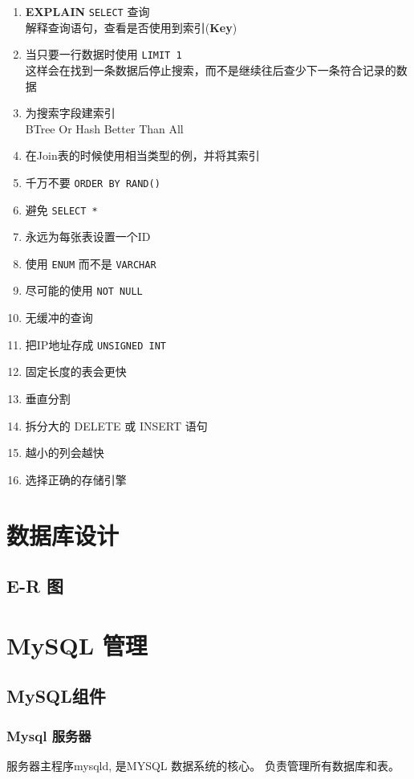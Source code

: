 \documentclass[UTF8,a4paper,12pt]{ctexbook}
\begin{document}
		\begin{enumerate}
			\item \textbf{EXPLAIN} \verb|SELECT| 查询 \\ 解释查询语句，查看是否使用到索引(\textbf{Key})
			\item 当只要一行数据时使用 \verb|LIMIT 1|  \\ 这样会在找到一条数据后停止搜索，而不是继续往后查少下一条符合记录的数据
			\item 为搜索字段建索引 \\ BTree Or Hash Better Than All
			\item 在Join表的时候使用相当类型的例，并将其索引
			\item 千万不要 \verb|ORDER BY RAND()|
			\item 避免 \verb|SELECT *|
			\item 永远为每张表设置一个ID
			\item 使用 \verb|ENUM| 而不是 \verb|VARCHAR|
			\item 尽可能的使用 \verb|NOT NULL|
			\item 无缓冲的查询
			\item 把IP地址存成 \verb|UNSIGNED INT|
			\item 固定长度的表会更快
			\item 垂直分割
			\item 拆分大的 DELETE 或 INSERT 语句
			\item 越小的列会越快
			\item 选择正确的存储引擎
		\end{enumerate}

\chapter{数据库设计}
	\section{E-R 图}

		

\chapter{MySQL 管理}
	\section{MySQL组件}
		\subsection{Mysql 服务器}
			服务器主程序mysqld, 是MYSQL 数据系统的核心。 负责管理所有数据库和表。
		
\end{document}
